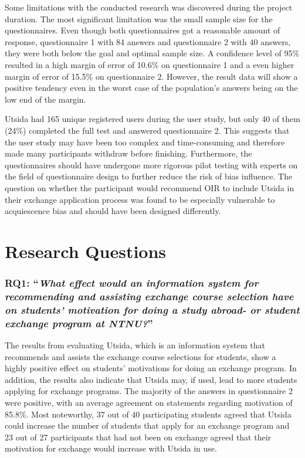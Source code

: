 Some limitations with the conducted research was discovered during the project duration. The most significant limitation was the small sample size for the questionnaires. Even though both questionnaires got a reasonable amount of response, questionnaire 1 with 84 answers and questionnaire 2 with 40 answers, they were both below the goal and optimal sample size. A confidence level of 95\% resulted in a high margin of error of 10.6\% on questionnaire 1 and a even higher margin of error of 15.5\% on questionnaire 2. However, the result data will show a positive tendency even in the worst case of the population's answers being on the low end of the margin. 

Utsida had 165 unique registered users during the user study, but only 40 of them (24\%) completed the full test and answered questionnaire 2. This suggests that the user study may have been too complex and time-consuming and therefore made many participants withdraw before finishing. Furthermore, the questionnaires should have undergone more rigorous pilot testing with experts on the field of questionnaire design to further reduce the risk of bias influence. The question on whether the participant would recommend OIR to include Utsida in their exchange application process was found to be especially vulnerable to acquiescence bias and should have been designed differently.

\section{Research Questions}

\subsubsection{RQ1: \enquote{\textit{What effect would an information system for recommending and assisting exchange course selection have on students' motivation for doing a study abroad- or student exchange program at NTNU?}}}

The results from evaluating Utsida, which is an information system that recommends and assists the exchange course selections for students, show a highly positive effect on students' motivations for doing an exchange program. In addition, the results also indicate that Utsida may, if used, lead to more students applying for exchange programs. The majority of the answers in questionnaire 2 were positive, with an average agreement on statements regarding motivation of 85.8\%. Most noteworthy, 37 out of 40 participating students agreed that Utsida could increase the number of students that apply for an exchange program and 23 out of 27 participants that had not been on exchange agreed that their motivation for exchange would increase with Utsida in use.

